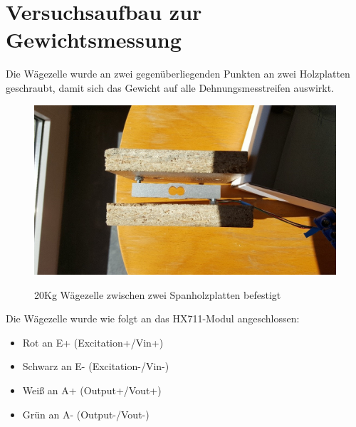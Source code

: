\section{Versuchsaufbau zur Gewichtsmessung}
Die Wägezelle wurde an zwei gegenüberliegenden Punkten an zwei Holzplatten geschraubt, damit sich das Gewicht auf alle Dehnungsmesstreifen auswirkt.\\
\begin{figure}[H]
    \center
    \includegraphics[width=15cm]{Bilder/waegezelle.jpg}\\
    \caption{20Kg Wägezelle zwischen zwei Spanholzplatten befestigt}
\end{figure}
Die Wägezelle wurde wie folgt an das HX711-Modul angeschlossen: 
\begin{itemize}
    \item Rot an E+ (Excitation+/Vin+) 
    \item Schwarz an E- (Excitation-/Vin-) 
    \item Weiß an A+ (Output+/Vout+) 
    \item Grün an A- (Output-/Vout-) 
\end{itemize}

